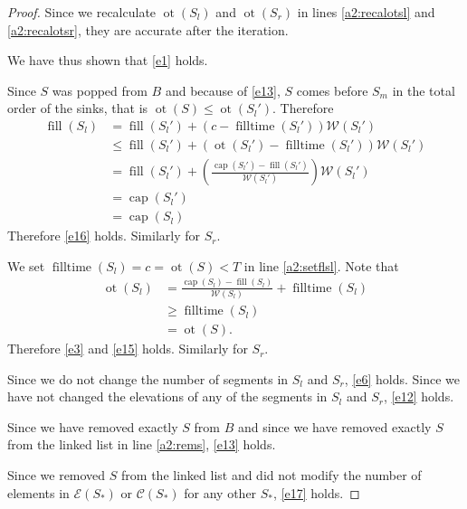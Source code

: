 \documentclass[11pt,a4paper]{article}
\DeclareMathOperator{\capp}{cap}
\DeclareMathOperator{\ot}{ot}
\DeclareMathOperator{\Fill}{fill}
\DeclareMathOperator{\filltime}{filltime}
\begin{document}
\begin{proof}
Since we recalculate $\ot(S_l)$ and $\ot(S_r)$ in lines \ref{a2:recalotsl} and \ref{a2:recalotsr}, they are accurate after the iteration.

We have thus shown that \ref{e1} holds.

Since $S$ was popped from $B$ and because of \ref{e13}, $S$ comes before $S_m$ in the total order of the sinks, that is $\ot(S)\le\ot(S_l')$.
Therefore
\begin{align*}
    \Fill(S_l) &= \Fill(S_l') + (c-\filltime(S_l'))\mathcal{W}(S_l') \\
               &\le \Fill(S_l') + (\ot(S_l')-\filltime(S_l'))\mathcal{W}(S_l') \\
               &= \Fill(S_l') + \left(\frac{\capp(S_l') - \Fill(S_l')}{\mathcal{W}(S_l')}\right)\mathcal{W}(S_l') \\
               &= \capp(S_l') \\
               &= \capp(S_l)
\end{align*}
Therefore \ref{e16} holds.
Similarly for $S_r$.

We set $\filltime(S_l) = c = \ot(S) < T$ in line \ref{a2:setflsl}.
Note that
\begin{align*}
    \ot(S_l) &= \frac{\capp(S_l) - \Fill(S_l)}{\mathcal{W}(S_l)} + \filltime(S_l) \\
             &\ge \filltime(S_l) \\
             &= \ot(S).
\end{align*}
Therefore \ref{e3} and \ref{e15} holds.
Similarly for $S_r$.

Since we do not change the number of segments in $S_l$ and $S_r$, \ref{e6} holds.
Since we have not changed the elevations of any of the segments in $S_l$ and $S_r$, \ref{e12} holds.

Since we have removed exactly $S$ from $B$ and since we have removed exactly $S$ from the linked list in line \ref{a2:rems}, \ref{e13} holds.

Since we removed $S$ from the linked list and did not modify the number of elements in $\mathcal{E}(S_*)$ or $\mathcal{C}(S_*)$ for any other $S_*$, \ref{e17} holds.


\end{proof}
\end{document}
